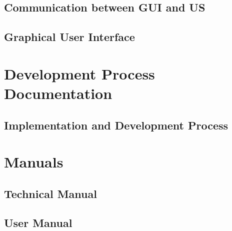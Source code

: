 \documentclass[11pt, oneside]{book}
\begin{document}
\chapter{Communication between GUI and US}


\chapter{Graphical User Interface}


\label{part:manuals}

\part{Development Process Documentation}

\chapter{Implementation and Development Process}


\part{Manuals}

\chapter{Technical Manual}


\chapter{User Manual}

\end{document}
